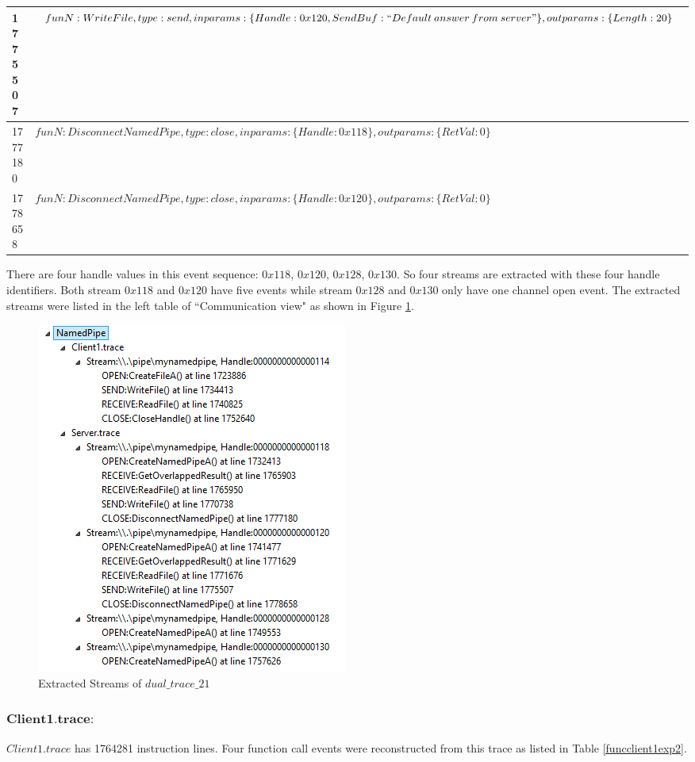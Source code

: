 \begin{table}[H]
\begin{tabular}{|l|p{16cm}|}
\hline
  1775507 & $funN:WriteFile, type:send, inparams:\lbrace Handle:0x120, SendBuf:``Default\: answer\: from\: server"\rbrace, outparams: \lbrace Length:20 \rbrace$\\
\hline
 1777180&$funN:DisconnectNamedPipe, type:close, inparams: \lbrace Handle:0x118 \rbrace, outparams: \lbrace RetVal:0 \rbrace$\\
\hline   
 1778658&$funN:DisconnectNamedPipe, type:close, inparams: \lbrace Handle:0x120 \rbrace, outparams: \lbrace RetVal:0 \rbrace$\\
\hline               
  \end{tabular}
\end{table}

There are four handle values in this event sequence: $0x118$, $0x120$, $0x128$, $0x130$. So four streams are extracted with these four handle identifiers. Both stream $0x118$ and $0x120$ have five events while stream $0x128$ and $0x130$ only have one channel open event. The extracted streams were listed in the left table  of ``Communication view"  as shown in Figure \ref{result21_streams}.

\begin{figure}[H]
\centerline{\includegraphics{Figures/result21_streams}}
 \caption{Extracted Streams of $dual\_trace\_21$}
\label{result21_streams}
\end{figure}

\subsubsection{$\boldsymbol{Client1.trace:}$}
$Client1.trace$ has 1764281 instruction lines. Four function call events were reconstructed from this trace as listed in Table \ref{funcclient1exp2}.

